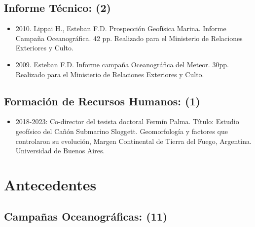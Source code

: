 \documentclass[11pt, a4paper]{article}
\begin{document}
\subsection{Informe Técnico: (2)}

\begin{itemize}
    \item 2010. Lippai H., Esteban F.D. Prospección Geofísica Marina. Informe Campaña Oceanográfica. 42 pp. Realizado para el Ministerio de Relaciones Exteriores y Culto.
    \item 2009. Esteban F.D. Informe campaña Oceanográfica del Meteor. 30pp. Realizado para el Ministerio de Relaciones Exteriores y Culto.
\end{itemize}


\subsection{Formación de Recursos Humanos: (1)}

\begin{itemize}
    \item 2018-2023: Co-director del tesista doctoral Fermín Palma. Título: Estudio geofísico del Cañón Submarino Sloggett. Geomorfología y factores que controlaron su evolución, Margen Continental de Tierra del Fuego, Argentina. Universidad de Buenos Aires.
\end{itemize}


\section{Antecedentes}


\subsection{Campañas Oceanográficas: (11)}
\end{document}
